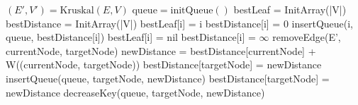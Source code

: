\documentclass[parskip=half,a4paper]{scrartcl}
\begin{document}
\begin{algorithmic}[1]
\State $(E',V') = \text{Kruskal}(E, V)$ 
\State $\text{queue} = \text{initQueue}()$
\State bestLeaf = InitArray(|V|)
\State bestDistance = InitArray(|V|)
 
 
\State bestLeaf[i] = i
\State bestDistance[i] = 0
\State insertQueue(i, queue, bestDistance[i]) 
\Else {}
\State bestLeaf[i] = nil
\State bestDistance[i] = $\infty$
\EndIf
\EndFor
{}  \label{outer} 
 \label{inner}
\State removeEdge(E', currentNode, targetNode)
\State newDistance = bestDistance[currentNode] + W((currentNode, targetNode))
\State bestDistance[targetNode] = newDistance
\State insertQueue(queue, targetNode, newDistance) 
\State bestDistance[targetNode] = newDistance
\State decreaseKey(queue, targetNode, newDistance) 
\EndIf
\EndWhile
\EndWhile
\EndProcedure
\end{algorithmic}
\end{document}
